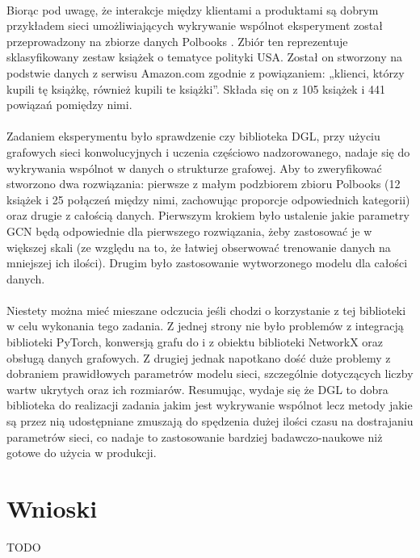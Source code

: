 \documentclass{article}
\begin{document}
\paragraph{}
Biorąc pod uwagę, że interakcje między klientami a produktami są dobrym przykładem sieci umożliwiających wykrywanie wspólnot eksperyment został przeprowadzony na zbiorze danych Polbooks \cite{polbooks}. Zbiór ten reprezentuje sklasyfikowany zestaw książek o tematyce polityki USA. Został on stworzony na podstwie danych z serwisu Amazon.com zgodnie z powiązaniem: „klienci, którzy kupili tę książkę, również kupili te książki”. Składa się on z 105 książek i 441 powiązań pomiędzy nimi. 

\paragraph{}
Zadaniem eksperymentu było sprawdzenie czy biblioteka DGL, przy użyciu grafowych sieci konwolucyjnych i uczenia częściowo nadzorowanego, nadaje się do wykrywania wspólnot w danych o strukturze grafowej. Aby to zweryfikować stworzono dwa rozwiązania: pierwsze z małym podzbiorem zbioru Polbooks (12 książek i 25 połączeń między nimi, zachowując proporcje odpowiednich kategorii) oraz drugie z całością danych. Pierwszym krokiem było ustalenie jakie parametry GCN będą odpowiednie dla pierwszego rozwiązania, żeby zastosować je w większej skali (ze względu na to, że łatwiej obserwować trenowanie danych na mniejszej ich ilości). Drugim było zastosowanie wytworzonego modelu dla całości danych.

\paragraph{}
Niestety można mieć mieszane odczucia jeśli chodzi o korzystanie z tej biblioteki w celu wykonania tego zadania.
Z jednej strony nie było problemów z integracją biblioteki PyTorch, konwersją grafu do i z obiektu biblioteki NetworkX oraz obsługą danych grafowych. Z drugiej jednak napotkano dość duże problemy z dobraniem prawidłowych parametrów modelu sieci, szczególnie dotyczących liczby wartw ukrytych oraz ich rozmiarów. Resumując, wydaje się że DGL to dobra biblioteka do realizacji zadania jakim jest wykrywanie wspólnot lecz metody jakie są przez nią udostępniane zmuszają do spędzenia dużej ilości czasu na dostrajaniu parametrów sieci, co nadaje to zastosowanie bardziej badawczo-naukowe niż gotowe do użycia w produkcji.

\section{Wnioski}
\label{sec:conclusions}
TODO
\end{document}
